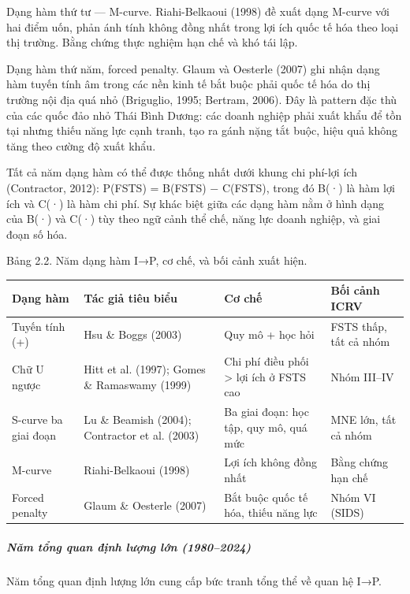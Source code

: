\documentclass[12pt,a4paper]{article}
\begin{document}
Dạng hàm thứ tư --- M-curve. Riahi-Belkaoui (1998) đề xuất dạng M-curve
với hai điểm uốn, phản ánh tính không đồng nhất trong lợi ích quốc tế
hóa theo loại thị trường. Bằng chứng thực nghiệm hạn chế và khó tái lập.

Dạng hàm thứ năm, forced penalty. Glaum và Oesterle (2007) ghi nhận dạng
hàm tuyến tính âm trong các nền kinh tế bắt buộc phải quốc tế hóa do thị
trường nội địa quá nhỏ (Briguglio, 1995; Bertram, 2006). Đây là pattern
đặc thù của các quốc đảo nhỏ Thái Bình Dương: các doanh nghiệp phải xuất
khẩu để tồn tại nhưng thiếu năng lực cạnh tranh, tạo ra gánh nặng tắt
buộc, hiệu quả không tăng theo cường độ xuất khẩu.

Tất cả năm dạng hàm có thể được thống nhất dưới khung chi phí-lợi ích
(Contractor, 2012): P(FSTS) = B(FSTS) − C(FSTS), trong đó B(·) là hàm
lợi ích và C(·) là hàm chi phí. Sự khác biệt giữa các dạng hàm nằm ở
hình dạng của B(·) và C(·) tùy theo ngữ cảnh thể chế, năng lực doanh
nghiệp, và giai đoạn số hóa.

Bảng 2.2. Năm dạng hàm I→P, cơ chế, và bối cảnh xuất hiện.

\begin{longtable}[]{@{}llll@{}}
\toprule\noalign{}
Dạng hàm & Tác giả tiêu biểu & Cơ chế & Bối cảnh ICRV \\
\midrule\noalign{}
\endhead
\bottomrule\noalign{}
\endlastfoot
Tuyến tính (+) & Hsu \& Boggs (2003) & Quy mô + học hỏi & FSTS thấp, tất
cả nhóm \\
Chữ U ngược & Hitt et al. (1997); Gomes \& Ramaswamy (1999) & Chi phí
điều phối \textgreater{} lợi ích ở FSTS cao & Nhóm III--IV \\
S-curve ba giai đoạn & Lu \& Beamish (2004); Contractor et al. (2003) &
Ba giai đoạn: học tập, quy mô, quá mức & MNE lớn, tất cả nhóm \\
M-curve & Riahi-Belkaoui (1998) & Lợi ích không đồng nhất & Bằng chứng
hạn chế \\
Forced penalty & Glaum \& Oesterle (2007) & Bắt buộc quốc tế hóa, thiếu
năng lực & Nhóm VI (SIDS) \\
\end{longtable}

\hypertarget{nux103m-tux1ed5ng-quan-ux111ux1ecbnh-lux1b0ux1ee3ng-lux1edbn-19802024}{%
\subparagraph{Năm tổng quan định lượng lớn
(1980--2024)}\label{nux103m-tux1ed5ng-quan-ux111ux1ecbnh-lux1b0ux1ee3ng-lux1edbn-19802024}}

Năm tổng quan định lượng lớn cung cấp bức tranh tổng thể về quan hệ I→P.
\end{document}

